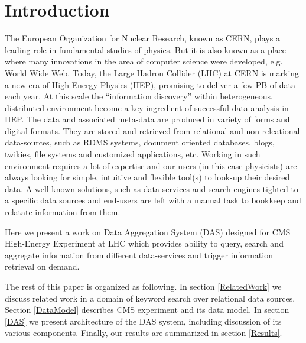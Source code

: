 \documentclass[a4paper]{jpconf}
\begin{document}
\section{Introduction}
The European Organization for Nuclear Research, known as CERN, plays a leading
role in fundamental studies of physics. But it is also known as a place where
many innovations in the area of computer science were developed, e.g. World Wide Web.
Today, the Large Hadron Collider (LHC) at CERN is marking a new era of High Energy
Physics (HEP), promising to deliver a few PB of data each year. 
At this scale the ``information discovery'' within heterogeneous, distributed 
environment become a key ingredient of successful data analysis in HEP.
The data and associated meta-data are produced in variety of forms and digital formats.
They are stored and retrieved from relational and non-releational data-sources, such as 
RDMS systems, document oriented databases, blogs, twikies, file systems and
customized applications, etc. 
Working in such environment requires a lot of expertise and our users
(in this case physicists) are always looking for simple, intuitive and flexible
tool(s) to look-up their desired data. A well-known solutions, such as data-services
and search engines tighted to a specific data sources and end-users are left 
with a manual task to bookkeep and relatate information from them.

Here we present a work on Data Aggregation System (DAS) designed for
CMS High-Energy Experiment at LHC which provides
ability to query, search and aggregate information from different 
data-services and trigger information retrieval on demand.

The rest of this paper is organized as following. 
In section \ref{RelatedWork} we discuss related work in a domain of 
keyword search over relational data sources.
Section \ref{DataModel} describes CMS experiment and its data model. In section
\ref{DAS} we present architecture of the DAS system, including discussion of its
various components. Finally, our results are summarized in section \ref{Results}.

\end{document}
